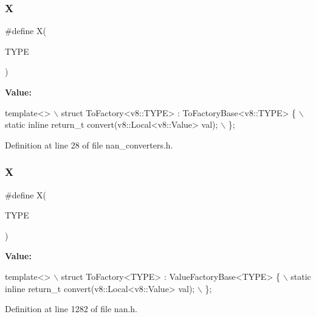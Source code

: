 \subsubsection{X\hspace{0.1cm}{\footnotesize\ttfamily [2/4]}}
{\footnotesize\ttfamily \#define X(\begin{DoxyParamCaption}\item[{}]{T\+Y\+PE }\end{DoxyParamCaption})}

{\bfseries Value\+:}
\begin{DoxyCode}
\textcolor{keyword}{template}<>                                                                 \(\backslash\)
    struct ToFactory<v8::TYPE> : ToFactoryBase<v8::TYPE> \{                     \(\backslash\)
      static \textcolor{keyword}{inline} return\_t convert(v8::Local<v8::Value> val);                \(\backslash\)
    \};
\end{DoxyCode}


Definition at line 28 of file nan\+\_\+converters.\+h.

\mbox{\label{nan_8h_ad9853fca332475faf665e45daaff16ab}} 
\subsubsection{X\hspace{0.1cm}{\footnotesize\ttfamily [3/4]}}
{\footnotesize\ttfamily \#define X(\begin{DoxyParamCaption}\item[{}]{T\+Y\+PE }\end{DoxyParamCaption})}

{\bfseries Value\+:}
\begin{DoxyCode}
\textcolor{keyword}{template}<>                                                                 \(\backslash\)
    struct ToFactory<TYPE> : ValueFactoryBase<TYPE> \{                          \(\backslash\)
      static \textcolor{keyword}{inline} return\_t convert(v8::Local<v8::Value> val);                \(\backslash\)
    \};
\end{DoxyCode}


Definition at line 1282 of file nan.\+h.

\mbox{\label{nan__converters_8h_ad9853fca332475faf665e45daaff16ab}} 
